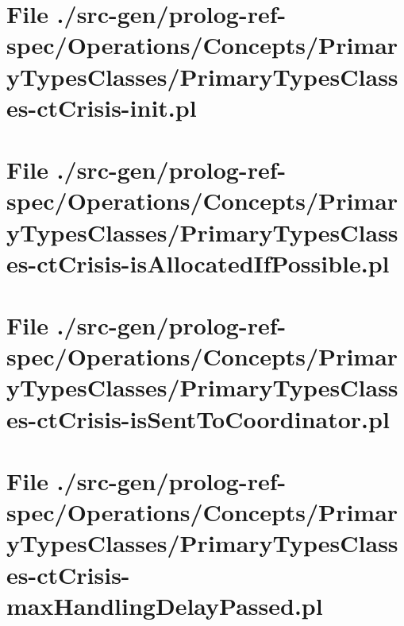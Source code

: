 \section[File /src-gen/prolog-ref-spec.../PrimaryTypesClasses-ctCrisis-init.pl]{File ./src-gen/prolog-ref-spec/Operations/Concepts/PrimaryTypesClasses/PrimaryTypesClasses-ctCrisis-init.pl}
\scriptsize

\normalsize
	
\section[File /src-gen.../PrimaryTypesClasses-ctCrisis-isAllocatedIfPossible.pl]{File ./src-gen/prolog-ref-spec/Operations/Concepts/PrimaryTypesClasses/PrimaryTypesClasses-ctCrisis-isAllocatedIfPossible.pl}
\scriptsize

\normalsize
	
\section[File /src-gen.../PrimaryTypesClasses-ctCrisis-isSentToCoordinator.pl]{File ./src-gen/prolog-ref-spec/Operations/Concepts/PrimaryTypesClasses/PrimaryTypesClasses-ctCrisis-isSentToCoordinator.pl}
\scriptsize

\normalsize
	
\section[File /src-gen.../PrimaryTypesClasses-ctCrisis-maxHandlingDelayPassed.pl]{File ./src-gen/prolog-ref-spec/Operations/Concepts/PrimaryTypesClasses/PrimaryTypesClasses-ctCrisis-maxHandlingDelayPassed.pl}
\scriptsize

\normalsize
	
